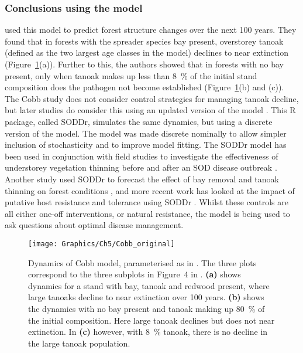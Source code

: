 \subsubsection{Conclusions using the model}

\citet{cobb_ecosystem_2012} used this model to predict forest structure changes over the next 100 years. They found that in forests with the spreader species bay present, overstorey tanoak (defined as the two largest age classes in the model) declines to near extinction (Figure~\ref{fig:ch5:cobb_host_change}(a)). Further to this, the authors showed that in forests with no bay present, only when tanoak makes up less than \SI{8}{\percent} of the initial stand composition does the pathogen not become established (Figure~\ref{fig:ch5:cobb_host_change}(b) and (c)). The Cobb study does not consider control strategies for managing tanoak decline, but later studies do consider this using an updated version of the model \citep{ross_soddr_2013}. This R package, called SODDr, simulates the same dynamics, but using a discrete version of the model. The model was made discrete nominally to allow simpler inclusion of stochasticity and to improve model fitting. The SODDr model has been used in conjunction with field studies to investigate the effectiveness of understorey vegetation thinning before and after an SOD disease outbreak \citep{cobb_resiliency_2017}. Another study used SODDr to forecast the effect of bay removal and tanoak thinning on forest conditions \citep{valachovic_forest_2017}, and more recent work has looked at the impact of putative host resistance and tolerance using SODDr \citep{cobb_promise_2019}. Whilst these controls are all either one-off interventions, or natural resistance, the model is being used to ask questions about optimal disease management.

\begin{figure}
    \begin{center}
        \texttt{[image: Graphics/Ch5/Cobb\_original]}
        \caption[Mixed stand model baseline dynamics]{Dynamics of Cobb model, parameterised as in \citet{cobb_ecosystem_2012}. The three plots correspond to the three subplots in Figure~4 in \citet{cobb_ecosystem_2012}. \textbf{(a)} shows dynamics for a stand with bay, tanoak and redwood present, where large tanoaks decline to near extinction over 100 years. \textbf{(b)} shows the dynamics with no bay present and tanoak making up \SI{80}{\percent} of the initial composition. Here large tanoak declines but does not near extinction. In \textbf{(c)} however, with \SI{8}{\percent} tanoak, there is no decline in the large tanoak population.\label{fig:ch5:cobb_host_change}}
    \end{center}
\end{figure}

